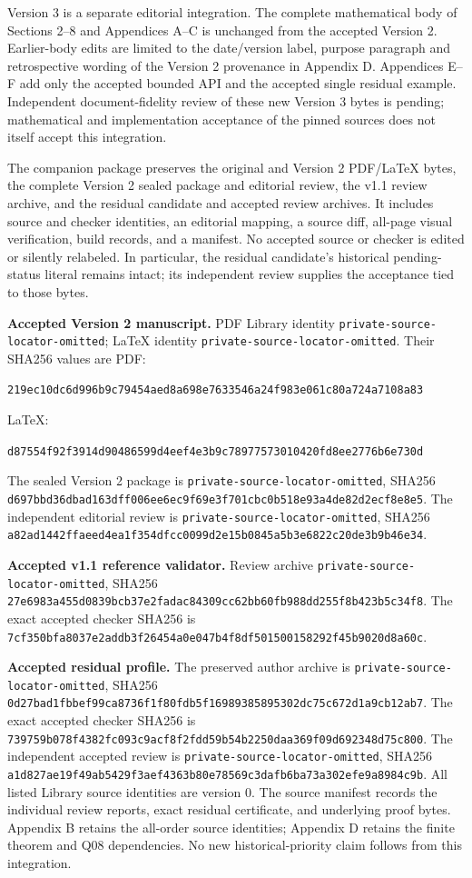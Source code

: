 \documentclass[
  11pt,
]{article}
\begin{document}
Version 3 is a separate editorial integration. The complete mathematical
body of Sections 2--8 and Appendices A--C is unchanged from the accepted
Version 2. Earlier-body edits are limited to the date/version label,
purpose paragraph and retrospective
wording of the Version 2 provenance in Appendix D. Appendices E--F add only
the accepted bounded API and the accepted single residual example.
Independent document-fidelity review of these new Version 3 bytes is
pending; mathematical and implementation acceptance of the pinned sources
does not itself accept this integration.

The companion package preserves the original and Version 2 PDF/LaTeX bytes,
the complete Version 2 sealed package and editorial review, the v1.1
review archive, and the residual candidate and accepted review archives.
It includes source and checker identities, an editorial mapping, a source
diff, all-page visual verification, build records, and a manifest. No
accepted source or checker is edited or silently relabeled. In particular,
the residual candidate's historical pending-status literal remains intact;
its independent review supplies the acceptance tied to those bytes.

\textbf{Accepted Version 2 manuscript.} PDF Library identity
\nolinkurl{private-source-locator-omitted}; LaTeX identity
\nolinkurl{private-source-locator-omitted}. Their SHA256 values are
PDF:

\nolinkurl{219ec10dc6d996b9c79454aed8a698e7633546a24f983e061c80a724a7108a83}

LaTeX:

\nolinkurl{d87554f92f3914d90486599d4eef4e3b9c78977573010420fd8ee2776b6e730d}

The sealed Version 2 package is
\nolinkurl{private-source-locator-omitted}, SHA256
\nolinkurl{d697bbd36dbad163dff006ee6ec9f69e3f701cbc0b518e93a4de82d2ecf8e8e5}.
The independent editorial review is
\nolinkurl{private-source-locator-omitted}, SHA256
\nolinkurl{a82ad1442ffaeed4ea1f354dfcc0099d2e15b0845a5b3e6822c20de3b9b46e34}.

\textbf{Accepted v1.1 reference validator.} Review archive
\nolinkurl{private-source-locator-omitted}, SHA256
\nolinkurl{27e6983a455d0839bcb37e2fadac84309cc62bb60fb988dd255f8b423b5c34f8}.
The exact accepted checker SHA256 is
\nolinkurl{7cf350bfa8037e2addb3f26454a0e047b4f8df501500158292f45b9020d8a60c}.

\textbf{Accepted residual profile.} The preserved author archive is
\nolinkurl{private-source-locator-omitted}, SHA256
\nolinkurl{0d27bad1fbbef99ca8736f1f80fdb5f16989385895302dc75c672d1a9cb12ab7}.
The exact accepted checker SHA256 is
\nolinkurl{739759b078f4382fc093c9acf8f2fdd59b54b2250daa369f09d692348d75c800}.
The independent accepted review is
\nolinkurl{private-source-locator-omitted}, SHA256
\nolinkurl{a1d827ae19f49ab5429f3aef4363b80e78569c3dafb6ba73a302efe9a8984c9b}.
All listed Library source identities are version 0. The source manifest
records the individual review reports, exact residual certificate, and
underlying proof bytes. Appendix B retains the all-order source identities;
Appendix D retains the finite theorem and Q08 dependencies. No new
historical-priority claim follows from this integration.
\end{document}
